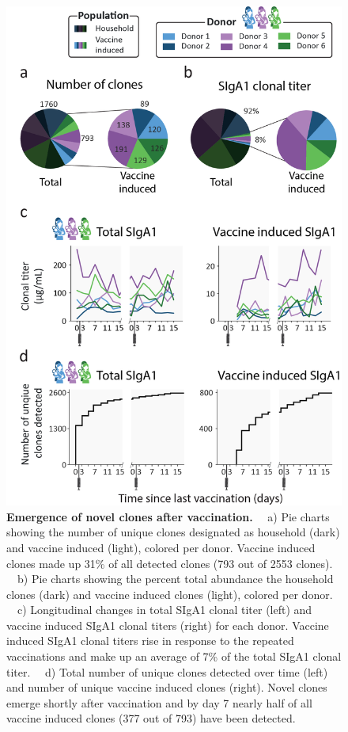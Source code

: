 \begin{figure}[!htp]
  \center
  \includegraphics[]{Chapter.4/Figures/f2.png}
  \caption{\textbf{Emergence of novel clones after vaccination.} ~~a) Pie charts showing the number of unique clones designated as household (dark) and vaccine induced (light), colored per donor. Vaccine induced clones made up 31\% of all detected clones (793 out of 2553 clones). ~~b) Pie charts showing the percent total abundance the household clones (dark) and vaccine induced clones (light), colored per donor. ~~c) Longitudinal changes in total SIgA1 clonal titer (left) and vaccine induced SIgA1 clonal titers (right) for each donor. Vaccine induced SIgA1 clonal titers rise in response to the repeated vaccinations and make up an average of 7\% of the total SIgA1 clonal titer. ~~d) Total number of unique clones detected over time (left) and number of unique vaccine induced clones (right). Novel clones emerge shortly after vaccination and by day 7 nearly half of all vaccine induced clones (377 out of 793) have been detected.
  }
  \label{fig:fig4.2}
\end{figure}

